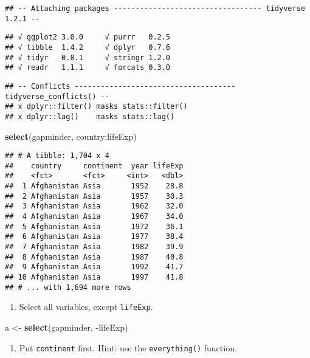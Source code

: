 \documentclass[]{article}
\newenvironment{Shaded}{\begin{snugshade}}{\end{snugshade}}
\newcommand{\KeywordTok}[1]{\textcolor[rgb]{0.13,0.29,0.53}{\textbf{{#1}}}}
\newcommand{\StringTok}[1]{\textcolor[rgb]{0.31,0.60,0.02}{{#1}}}
\newcommand{\NormalTok}[1]{{#1}}
\providecommand{\tightlist}{%
  \setlength{\itemsep}{0pt}\setlength{\parskip}{0pt}}
\begin{document}
\begin{verbatim}
## -- Attaching packages ---------------------------------- tidyverse 1.2.1 --
\end{verbatim}

\begin{verbatim}
## √ ggplot2 3.0.0     √ purrr   0.2.5
## √ tibble  1.4.2     √ dplyr   0.7.6
## √ tidyr   0.8.1     √ stringr 1.2.0
## √ readr   1.1.1     √ forcats 0.3.0
\end{verbatim}

\begin{verbatim}
## -- Conflicts ------------------------------------- tidyverse_conflicts() --
## x dplyr::filter() masks stats::filter()
## x dplyr::lag()    masks stats::lag()
\end{verbatim}

\begin{Shaded}
\begin{Highlighting}[]
\KeywordTok{select}\NormalTok{(gapminder, country:lifeExp)}
\end{Highlighting}
\end{Shaded}

\begin{verbatim}
## # A tibble: 1,704 x 4
##    country     continent  year lifeExp
##    <fct>       <fct>     <int>   <dbl>
##  1 Afghanistan Asia       1952    28.8
##  2 Afghanistan Asia       1957    30.3
##  3 Afghanistan Asia       1962    32.0
##  4 Afghanistan Asia       1967    34.0
##  5 Afghanistan Asia       1972    36.1
##  6 Afghanistan Asia       1977    38.4
##  7 Afghanistan Asia       1982    39.9
##  8 Afghanistan Asia       1987    40.8
##  9 Afghanistan Asia       1992    41.7
## 10 Afghanistan Asia       1997    41.8
## # ... with 1,694 more rows
\end{verbatim}

\begin{enumerate}
\def\labelenumi{\arabic{enumi}.}
\setcounter{enumi}{2}
\tightlist
\item
  Select all variables, except \texttt{lifeExp}.
\end{enumerate}

\begin{Shaded}
\begin{Highlighting}[]
\NormalTok{a <-}\StringTok{ }\KeywordTok{select}\NormalTok{(gapminder, -lifeExp)}
\end{Highlighting}
\end{Shaded}

\begin{enumerate}
\def\labelenumi{\arabic{enumi}.}
\setcounter{enumi}{3}
\tightlist
\item
  Put \texttt{continent} first. Hint: use the \texttt{everything()}
  function.
\end{enumerate}
\end{document}
